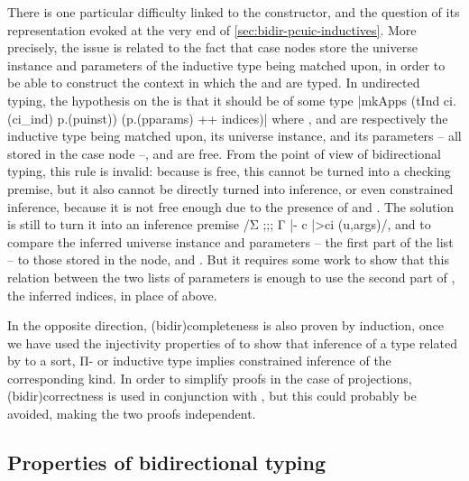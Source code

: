 There is one particular difficulty linked to the  constructor, and the question
of its representation evoked at the very end of \cref{sec:bidir-pcuic-inductives}.
More precisely, the issue is related to the fact that case nodes store the universe
instance and parameters of the inductive type being matched upon, in order to be able to
construct the context in which the  and  are typed.
In undirected typing, the hypothesis on the  is that it should be of some type
\coqline|mkApps (tInd ci.(ci_ind) p.(puinst)) (p.(pparams) ++ indices)|
where ,  and 
are respectively the inductive type being matched upon, its universe instance, and its
parameters – all stored in the case node –, and 
are free. From the point of view of bidirectional typing, this rule is invalid:%
%
because  is free, this cannot be turned into a checking premise, but it also
cannot be directly turned into inference, or even constrained inference, because it is
not free enough due to the presence of  and .
The solution is still to turn it into an inference premise
\coqe/Σ ;;; Γ |- c |>{ci} (u,args)/, and to compare the inferred universe instance 
and parameters – the first part of the list  – to those stored in the node, \eg
{} and . But it requires some work to
show that this relation between the two lists of parameters is enough to use the second part
of , the inferred indices, in place of  above.

In the opposite direction, \kl(bidir){completeness}%
is also proven by induction, once we have used
the injectivity properties of  to show that
inference of a type related by  to a sort, Π- or inductive type implies
constrained inference of the corresponding kind.
In order to simplify proofs in the case of projections,
\kl(bidir){correctness} is used in conjunction
with , but this could probably be avoided, making the two proofs independent.

\subsection{Properties of bidirectional typing}

